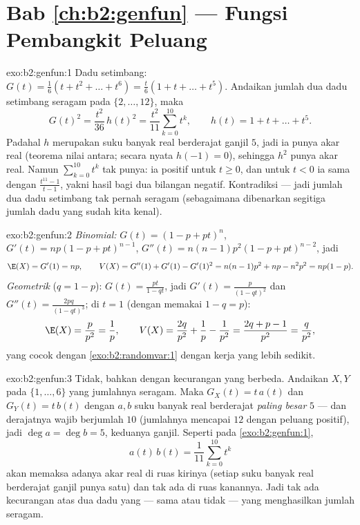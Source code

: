 \section*{Bab \ref{ch:b2:genfun} --- Fungsi Pembangkit Peluang}

\begin{solution}{exo:b2:genfun:1}
Dadu setimbang: $G(t) = \frac16(t + t^2 + \dots + t^6) = \frac t6(1 + t
+ \dots + t^5)$. Andaikan jumlah dua dadu setimbang seragam pada
$\{2, \dots, 12\}$, maka
\[
G(t)^2 = \frac{t^2}{36}\,h(t)^2
= \frac{t^2}{11}\sum_{k=0}^{10}t^k ,
\qquad h(t) = 1 + t + \dots + t^5 .
\]
Padahal $h$ merupakan suku banyak real berderajat ganjil $5$, jadi ia punya akar
real (teorema nilai antara; secara nyata $h(-1) = 0$), sehingga
$h^2$ punya akar real. Namun $\sum_{k=0}^{10}t^k$ tak punya: ia
positif untuk $t \geq 0$, dan untuk $t < 0$ ia sama dengan
$\frac{t^{11} - 1}{t - 1}$, yakni hasil bagi dua bilangan negatif.
Kontradiksi --- jadi jumlah dua dadu setimbang tak pernah seragam (sebagaimana
dibenarkan  segitiga jumlah dadu yang sudah kita kenal).
\end{solution}

\begin{solution}{exo:b2:genfun:2}
\emph{Binomial:} $G(t) = (1 - p + pt)^n$, $G'(t) = np(1 - p +
pt)^{n-1}$, $G''(t) = n(n-1)p^2(1 - p + pt)^{n-2}$, jadi
\[
\E(X) = G'(1) = np,
\qquad
V(X) = G''(1) + G'(1) - G'(1)^2
= n(n-1)p^2 + np - n^2p^2 = np(1-p).
\]
\emph{Geometrik} ($q = 1 - p$): $G(t) = \frac{pt}{1 - qt}$, jadi
$G'(t) = \frac{p}{(1 - qt)^2}$ dan $G''(t) = \frac{2pq}{(1 -
qt)^3}$; di $t = 1$ (dengan memakai $1 - q = p$):
\[
\E(X) = \frac{p}{p^2} = \frac1p,
\qquad
V(X) = \frac{2q}{p^2} + \frac1p - \frac{1}{p^2}
= \frac{2q + p - 1}{p^2}
= \frac{q}{p^2} ,
\]
yang cocok dengan \cref{exo:b2:randomvar:1} dengan kerja yang lebih sedikit.
\end{solution}

\begin{solution}{exo:b2:genfun:3}
Tidak, bahkan dengan kecurangan yang berbeda. Andaikan $X, Y$  pada
$\{1, \dots, 6\}$ yang jumlahnya seragam. Maka $G_X(t) = t\,a(t)$ dan
$G_Y(t) = t\,b(t)$ dengan $a, b$ suku banyak real berderajat \emph{paling
besar} $5$ --- dan derajatnya wajib berjumlah $10$ (jumlahnya mencapai
$12$ dengan peluang positif), jadi $\deg a = \deg b = 5$, keduanya
ganjil. Seperti pada \cref{exo:b2:genfun:1},
\[
a(t)\,b(t) = \frac{1}{11}\sum_{k=0}^{10}t^k
\]
akan memaksa adanya akar real di ruas kirinya (setiap suku banyak real
berderajat ganjil punya satu) dan tak ada di ruas kanannya. Jadi tak ada kecurangan atas
dua dadu yang  --- sama atau tidak --- yang menghasilkan jumlah seragam.
\end{solution}

